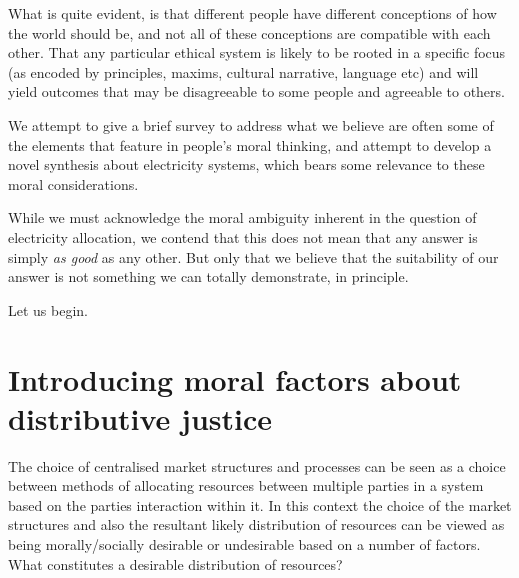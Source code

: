 What is quite evident, is that different people have different conceptions of how the world should be, and not all of these conceptions are compatible with each other.
That any particular ethical system is likely to be rooted in a specific focus (as encoded by principles, maxims, cultural narrative, language etc) and will yield outcomes that may be disagreeable to some people and agreeable to others.


We attempt to give a brief survey to address what we believe are often some of the elements that feature in people's moral thinking, and attempt to develop a novel synthesis about electricity systems, which bears some relevance to these moral considerations.

While we must acknowledge the moral ambiguity inherent in the question of electricity allocation, we contend that this does not mean that any answer is simply \textit{as good} as any other. But only that we believe that the suitability of our answer is not something we can totally demonstrate, in principle.

Let us begin.

\section{Introducing moral factors about distributive justice}

The choice of centralised market structures and processes can be seen as a choice between methods of allocating resources between multiple parties in a system based on the parties interaction within it.
In this context the choice of the market structures and also the resultant likely distribution of resources can be viewed as being morally/socially desirable or undesirable based on a number of factors.
What constitutes a desirable distribution of resources?


